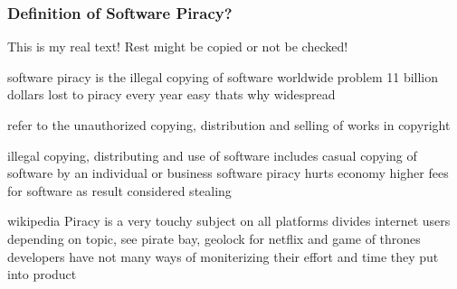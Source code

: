 \subsubsection{Definition of Software Piracy?} \label{subsubsection:foundation-piracy-overview-definition}
This is my real text! Rest might be copied or not be checked!

%
software piracy is the illegal copying of software
worldwide problem
11 billion dollars lost to piracy every year
easy thats why widespread
\cite{applePiracy}
%

%
refer to the unauthorized copying, distribution and selling of works in copyright

illegal copying, distributing and use of software
includes casual copying of software by an individual or business
software piracy hurts economy
higher fees for software as result
considered stealing



wikipedia
%
Piracy is a very touchy subject on all platforms
divides internet users depending on topic, see pirate bay, geolock for netflix and game of thrones
developers have not many ways of moniterizing their effort and time they put into product
